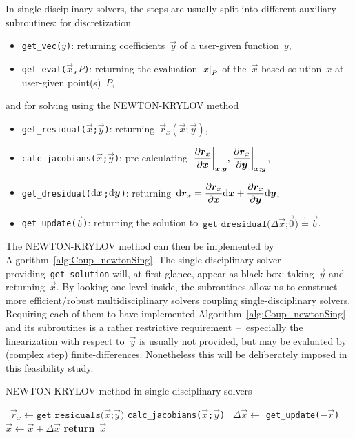 \documentclass[10pt, ngerman, english,
twoside, open=right,
numbers=noenddot,
declaration=section,
abstract=section,
abstract=multiple,
abstract=notoc,
declaration=notoc,
cd=pale, 
chapterprefix=off, 
chapterpage=false, 
headingsvskip=-10em,
cdgeometry=custom, 
slantedgreek=on,
cdmath=on, 
cdfont=on,
ttfont=false,
mathswap=off,
]{tudscrreprt}
\numberwithin{equation}{chapter}
\renewcommand{\textsc}[1]{\uppercase{\mbox{#1}}}
\newcommand{\sidenote}[1]{
  \leavevmode %
  \marginpar{\hyphenpenalty=1000 \flushleft{\textcolor{HKS41}{#1}}}}
\begin{document}
\sidenote{Subroutines}In single-disciplinary solvers, the steps are usually split into different auxiliary subroutines: for discretization
\begin{itemize}
\item \texttt{get\_vec($y$)}: returning coefficients~$\vec{y}$ of a user-given function~$y$,
\item \texttt{get\_eval($\vec{x}$,$P$)}: returning the evaluation~$\at{x}{P}$ of the~$\vec{x}$-based solution~$x$ at user-given point(s)~$P$,
\end{itemize}
and for solving using the \textsc{Newton}-\textsc{Krylov} method 
\begin{itemize}
\item \texttt{get\_residual($\vec{x}$;$\vec{y}$)}: returning~$\vec{r}_x(\vec{x};\vec{y})$,
\item \texttt{calc\_jacobians($\vec{x}$;$\vec{y}$)}: pre-calculating~$\displaystyle \pdiffa{\vec{r}_x}{\vec{x}}{\vec{x};\vec{y}}, \pdiffa{\vec{r}_x}{\vec{y}}{\vec{x};\vec{y}}$,
\item \texttt{get\_dresidual($\mathrm{d}\boldsymbol{x}$;$\mathrm{d}\boldsymbol{y}$)}: returning~$\displaystyle \d\vec{r}_x = \pdiff{\vec{r}_x}{\vec{x}} \d\vec{x} + \pdiff{\vec{r}_x}{\vec{y}} \d\vec{y}$,
\item \texttt{get\_update($\vec{b}$)}: returning the solution to~$\texttt{get\_dresidual($\Delta\vec{x}$;$\vec{0}$)} \overset!= \vec{b}$.
\end{itemize}
The \textsc{Newton}-\textsc{Krylov} method can then be implemented by Algorithm~\ref{alg:Coup_newtonSing}.
The single-disciplinary solver providing~\texttt{get\_solution} will, at first glance, appear as black-box: taking~$\vec{y}$ and returning~$\vec{x}$. By looking one level inside, the subroutines allow us to construct more efficient/robust multidisciplinary solvers coupling single-disciplinary solvers. Requiring each of them to have implemented Algorithm~\ref{alg:Coup_newtonSing} and its subroutines is a rather restrictive requirement~--~especially the linearization with respect to~$\vec{y}$ is usually not provided, but may be evaluated by (complex step) finite-differences. Nonetheless this will be deliberately imposed in this feasibility study.
\begin{algorithm}
\caption{\textsc{Newton}-\textsc{Krylov} method in single-disciplinary solvers}\label{alg:Coup_newtonSing}
\begin{algorithmic}[1]
\State~$\vec{r}_x \gets \texttt{get\_residuals($\vec{x}$;$\vec{y}$)}$
\State \texttt{calc\_jacobians($\vec{x}$;$\vec{y}$)}
\State~$\Delta\vec{x} \gets$ \texttt{get\_update($-\vec{r}$)}
\State~$\vec{x} \gets \vec{x} + \Delta\vec{x}$
\EndWhile
\State \textbf{return}~$\vec{x}$
\EndFunction
\end{algorithmic}
\end{algorithm}
\vspace*{-1.5em}
\end{document}
